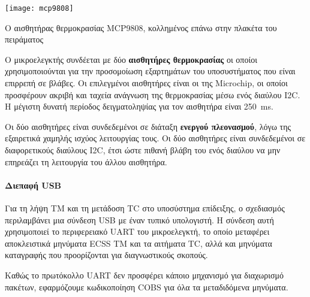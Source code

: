 \documentclass[a4paper,nobib]{tufte-book}
\begin{document}
\begin{marginfigure}
	\texttt{[image: mcp9808]}
	\caption{Ο αισθητήρας θερμοκρασίας MCP9808, κολλημένος επάνω στην πλακέτα του πειράματος}
\end{marginfigure}

Ο μικροελεγκτής συνδέεται με δύο \textbf{αισθητήρες θερμοκρασίας} οι οποίοι χρησιμοποιούνται για την προσομοίωση εξαρτημάτων του υποσυστήματος που είναι επιρρεπή σε βλάβες. Οι επιλεγμένοι αισθητήρες είναι οι  της Microchip, οι οποίοι προσφέρουν ακριβή και ταχεία ανάγνωση της θερμοκρασίας μέσω ενός διαύλου \ac{I2C}. Η μέγιστη δυνατή περίοδος δειγματοληψίας για τον αισθητήρα είναι \SI{250}{\milli\second}.


Οι δύο αισθητήρες είναι συνδεδεμένοι σε διάταξη \textbf{ενεργού πλεονασμού}, λόγω της εξαιρετικά χαμηλής ισχύος λειτουργίας τους. Οι δύο αισθητήρες είναι συνδεδεμένοι σε διαφορετικούς διαύλους \ac{I2C}, έτσι ώστε πιθανή βλάβη του ενός διαύλου να μην επηρεάζει τη λειτουργία του άλλου αισθητήρα.

\paragraph{Διεπαφή \acs{USB}} Για τη λήψη \acl{TM} και τη μετάδοση \acl{TC} στο υποσύστημα επίδειξης, ο σχεδιασμός περιλαμβάνει μια σύνδεση \acl{USB} με έναν τυπικό υπολογιστή. Η σύνδεση αυτή χρησιμοποιεί το περιφερειακό \acs{UART} του μικροελεγκτή, το οποίο μεταφέρει αποκλειστικά μηνύματα \acs{ECSS}  \acs{TM} και τα αιτήματα \acs{TC}, αλλά και μηνύματα καταγραφής που προορίζονται για διαγνωστικούς σκοπούς.

Καθώς το πρωτόκολλο \acs{UART} δεν προσφέρει κάποιο μηχανισμό για διαχωρισμό πακέτων, εφαρμόζουμε κωδικοποίηση \acs{COBS} \autocite{cheshire_consistent_overhead_1997} για όλα τα μεταδιδόμενα μηνύματα.
\end{document}
